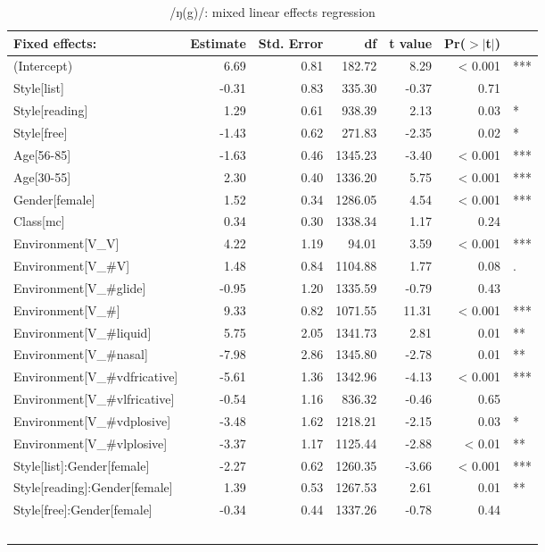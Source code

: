 \begin{table}[h]
	\centering
	\footnotesize
	\caption{/ŋ(g)/: mixed linear effects regression}
	\label{tab.regression.ng}
	\begin{tabular}{p{}rrrrrl}
		\hline
		Fixed effects: & Estimate & Std. Error & df & t value & Pr($>$$|$t$|$) & \\
		\hline
		(Intercept) & 6.69 & 0.81 & 182.72 & 8.29 & < 0.001 & *** \\ 
		Style[list] & -0.31 & 0.83 & 335.30 & -0.37 & 0.71 & \\ 
		Style[reading] & 1.29 & 0.61 & 938.39 & 2.13 & 0.03 & *\\ 
		Style[free] & -1.43 & 0.62 & 271.83 & -2.35 & 0.02 & *\\ 
		Age[56-85] & -1.63 & 0.46 & 1345.23 & -3.40 & < 0.001 & *** \\ 
		Age[30-55] & 2.30 & 0.40 & 1336.20 & 5.75 & < 0.001 & *** \\ 
		Gender[female] & 1.52 & 0.34 & 1286.05 & 4.54 & < 0.001 & *** \\ 
		Class[mc] & 0.34 & 0.30 & 1338.34 & 1.17 & 0.24 & \\ 
		Environment[V\_V] & 4.22 & 1.19 & 94.01 & 3.59 & < 0.001 & *** \\ 
		Environment[V\_\#V] & 1.48 & 0.84 & 1104.88 & 1.77 & 0.08 & . \\ 
		Environment[V\_\#glide] & -0.95 & 1.20 & 1335.59 & -0.79 & 0.43 & \\ 
		Environment[V\_\#] & 9.33 & 0.82 & 1071.55 & 11.31 & < 0.001 & *** \\ 
		Environment[V\_\#liquid] & 5.75 & 2.05 & 1341.73 & 2.81 & 0.01 & **\\ 
		Environment[V\_\#nasal] & -7.98 & 2.86 & 1345.80 & -2.78 & 0.01 & **\\ 
		Environment[V\_\#vdfricative] & -5.61 & 1.36 & 1342.96 & -4.13 & < 0.001 & *** \\ 
		Environment[V\_\#vlfricative] & -0.54 & 1.16 & 836.32 & -0.46 & 0.65 & \\ 
		Environment[V\_\#vdplosive] & -3.48 & 1.62 & 1218.21 & -2.15 & 0.03 & *\\ 
		Environment[V\_\#vlplosive] & -3.37 & 1.17 & 1125.44 & -2.88 & < 0.01 & ** \\ 
		Style[list]:Gender[female] & -2.27 & 0.62 & 1260.35 & -3.66 & < 0.001 & *** \\ 
		Style[reading]:Gender[female] & 1.39 & 0.53 & 1267.53 & 2.61 & 0.01 & ** \\ 
		Style[free]:Gender[female] & -0.34 & 0.44 & 1337.26 & -0.78 & 0.44 & \\ 
$$
\end{tabular}
\end{table}
